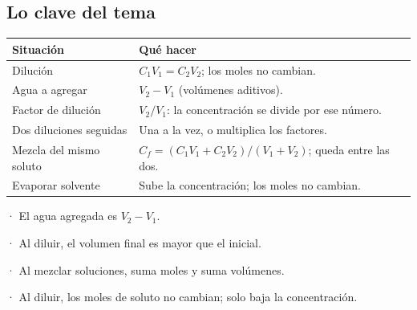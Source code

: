 \subsection{Lo clave del tema}
\begin{center}\small
\begin{tabularx}{\linewidth}{@{}>{\raggedright\arraybackslash\hsize=0.73\hsize}X>{\raggedright\arraybackslash\hsize=1.27\hsize}X@{}}
\toprule
\textbf{Situación} & \textbf{Qué hacer} \\
\midrule
Dilución & $C_1 V_1 = C_2 V_2$; los moles no cambian. \\
Agua a agregar & $V_2 - V_1$ (volúmenes aditivos). \\
Factor de dilución & $V_2 / V_1$: la concentración se divide por ese número. \\
Dos diluciones seguidas & Una a la vez, o multiplica los factores. \\
Mezcla del mismo soluto & $C_f = (C_1V_1 + C_2V_2)/(V_1 + V_2)$; queda entre las dos. \\
Evaporar solvente & Sube la concentración; los moles no cambian. \\
\bottomrule
\end{tabularx}
\end{center}
  
\begin{clave}[{Recuerda}] · El agua agregada es $V_2 - V_1$.\par · Al diluir, el volumen final es mayor que el inicial.\par · Al mezclar soluciones, suma moles y suma volúmenes.\par · Al diluir, los moles de soluto no cambian; solo baja la concentración.\end{clave}
 
